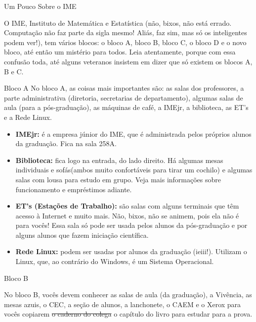 \begin{secao}{Um Pouco Sobre o IME}

O IME, Instituto de Matemática e Estatística (não, bixos, não está errado.
Computação não faz parte da sigla mesmo! Aliás, faz sim, mas só os inteligentes
podem ver!), tem vários blocos: o bloco A, bloco B, bloco C, o bloco D e o
novo bloco, até então um mistério para todos. Leia atentamente, porque com essa
confusão toda, até alguns veteranos insistem em dizer que só existem os blocos
A, B e C.


\begin{subsecao}{Bloco A}
No bloco A, as coisas mais importantes são: as salas dos professores, a parte
administrativa (diretoria, secretarias de departamento), algumas salas de aula
(para a pós-graduação), as máquinas de café, a IMEjr, a biblioteca, as ET's e
a Rede Linux.

\begin{itemize}

\item {\bf IMEjr:} é a empresa júnior do IME, que é administrada pelos próprios
alunos da graduação. Fica na sala 258A.

\item {\bf Biblioteca:} fica logo na entrada, do lado direito. Há algumas mesas
individuais e sofás(ambos muito confortáveis para tirar um cochilo) e algumas salas
com lousa para estudo em grupo. Veja mais informações sobre funcionamento e
empréstimos adiante.

\item {\bf ET's (Estações de Trabalho):} são salas com alguns terminais que têm
acesso à Internet e muito mais. Não, bixos, não se animem, pois ela não é para
vocês! Essa sala só pode ser usada pelos alunos da pós-graduação e por alguns
alunos que fazem iniciação científica.

\item {\bf Rede Linux:} podem ser usadas por alunos da graduação (ieiii!).
Utilizam o Linux, que, ao contrário do Windows, é um Sistema Operacional.

\end{itemize}

\end{subsecao}

\begin{subsecao}{Bloco B}


No bloco B, vocês devem conhecer as salas de aula (da graduação), a Vivência, as
mesas azuis, o CEC, a seção de alunos, a lanchonete, o CAEM e o Xerox para vocês
copiarem \sout{o caderno do colega} o capítulo do livro para estudar para a prova.


\end{subsecao}
\end{secao}
